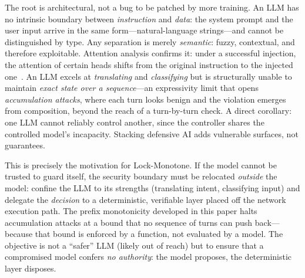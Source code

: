 \documentclass[conference]{IEEEtran}
\begin{document}
The root is architectural, not a bug to be patched by more training. An LLM
has no intrinsic boundary between \emph{instruction} and \emph{data}: the
system prompt and the user input arrive in the same form---natural-language
strings---and cannot be distinguished by type. Any separation is merely
\emph{semantic}: fuzzy, contextual, and therefore exploitable. Attention
analysis confirms it: under a successful injection, the attention of certain
heads shifts from the original instruction to the injected
one~\cite{attentiontracker2024}. An LLM excels at \emph{translating} and
\emph{classifying} but is structurally unable to maintain \emph{exact state
over a sequence}---an expressivity limit that opens \emph{accumulation
attacks}, where each turn looks benign and the violation emerges from
composition, beyond the reach of a turn-by-turn check. A direct corollary:
one LLM cannot reliably control another, since the controller shares the
controlled model's incapacity. Stacking defensive AI adds vulnerable
surfaces, not guarantees.

This is precisely the motivation for Lock-Monotone. If the model cannot be
trusted to guard itself, the security boundary must be relocated
\emph{outside} the model: confine the LLM to its strengths (translating
intent, classifying input) and delegate the \emph{decision} to a
deterministic, verifiable layer placed off the network execution path. The
prefix monotonicity developed in this paper halts accumulation attacks at a
bound that no sequence of turns can push back---because that bound is
enforced by a function, not evaluated by a model. The objective is not a
``safer'' LLM (likely out of reach) but to ensure that a compromised model
confers \emph{no authority}: the model proposes, the deterministic layer
disposes.
\end{document}
